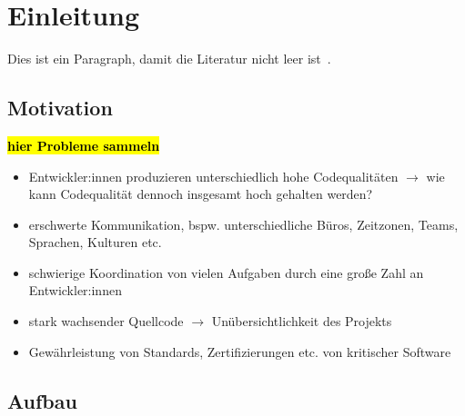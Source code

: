 
\setcounter{page}{1}

\section{Einleitung}
\label{sec:einleitung}

\lipsum[1]

Dies ist ein Paragraph, damit die Literatur nicht leer ist~\cite{atlassianGitflowWorkflow}.




\subsection{Motivation}
\label{sec:einleitung:motivation}

\hl{\textbf{hier Probleme sammeln}}

\begin{itemize}
    \item Entwickler:innen produzieren unterschiedlich hohe Codequalitäten $\to$ wie kann Codequalität dennoch insgesamt hoch gehalten werden?
    \item erschwerte Kommunikation, bspw. unterschiedliche Büros, Zeitzonen, Teams, Sprachen, Kulturen etc.
    \item schwierige Koordination von vielen Aufgaben durch eine große Zahl an Entwickler:innen
    \item stark wachsender Quellcode $\to$ Unübersichtlichkeit des Projekts
    \item Gewährleistung von Standards, Zertifizierungen etc. von kritischer Software
\end{itemize}




\subsection{Aufbau}
\label{sec:einleitung:aufbau}

\lipsum[3]
